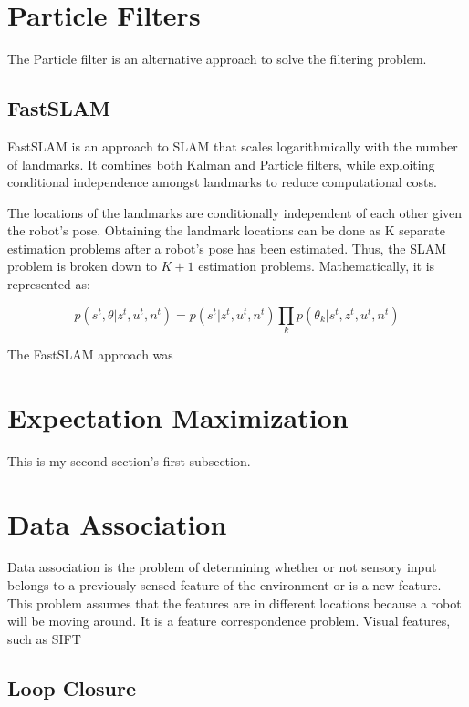 \documentclass[10pt,conference]{ieeeconf}
\begin{document}
\section {Particle Filters}

	The Particle filter is an alternative approach to solve the filtering problem. 

	
	\subsection{FastSLAM}
	
	
	FastSLAM \cite{montemerlo2002fastslam} is an approach to SLAM that scales logarithmically with the number of landmarks. It combines both Kalman and Particle filters, while exploiting conditional independence amongst landmarks to reduce computational costs.
	
	The locations of the landmarks are conditionally independent of each other given the robot's pose. Obtaining the landmark locations can be done as K separate estimation problems after a robot's pose has been estimated. Thus, the SLAM problem is broken down to $K+1$ estimation problems. Mathematically, it is represented as:
	
	\begin{equation}
	p(s^t, \theta | z^t, u^t, n^t) = p(s^t | z^t, u^t, n^t) \prod_k p(\theta_k | s^t, z^t, u^t, n^t)
	\end{equation}
	
	The FastSLAM approach was 

\section {Expectation Maximization}
    This is my second section's first subsection.
    
    
\section {Data Association}

	Data association is the problem of determining whether or not sensory input belongs to a previously sensed feature of the environment or is a new feature. This problem assumes that the features are in different locations because a robot will be moving around.
	It is a feature correspondence problem. 
	Visual features, such as SIFT
	
\subsection {Loop Closure}
\end{document}
